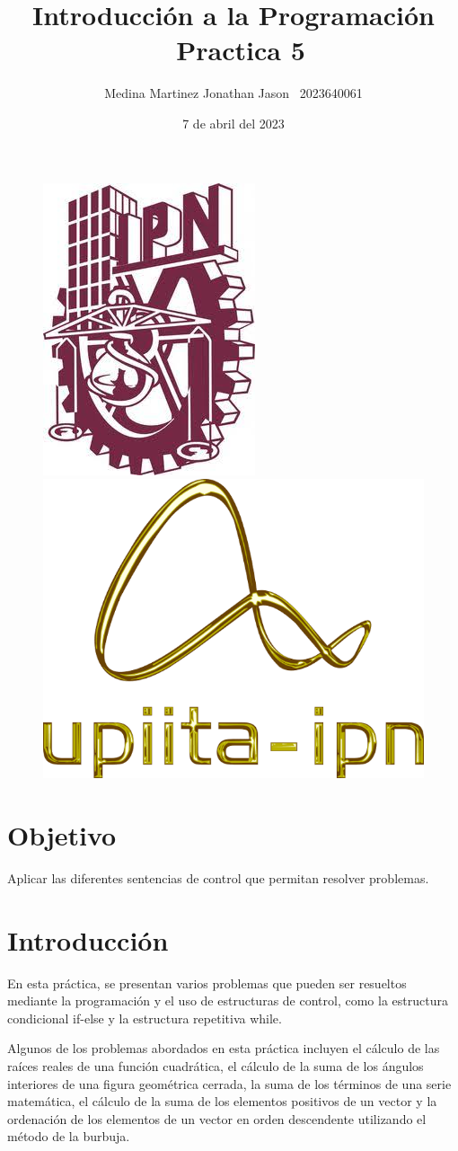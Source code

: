 \documentclass{article}
\title{Introducción a la Programación \ Practica 5}
\author{Medina Martinez Jonathan Jason \ 2023640061}
\date{7 de abril del 2023}
\begin{document}
	
	\fontsize{12}{16}\selectfont
	
	\begin{figure}[t]
		
		\includegraphics[width=2.5 cm]{Logo1.jpeg}
		\hfill
		\includegraphics[width=3 cm]{Logo2.png}
		
	\end{figure}
	
	\maketitle
	\newpage
	
	\tableofcontents
	\newpage
	
	\section{Objetivo}
	
	Aplicar las diferentes sentencias de control que permitan resolver problemas.
	
	\section{Introducción}
	
	En esta práctica, se presentan varios problemas que pueden ser resueltos mediante la programación y el uso de estructuras de control, como la estructura condicional if-else y la estructura repetitiva while.
	
	Algunos de los problemas abordados en esta práctica incluyen el cálculo de las raíces reales de una función cuadrática, el cálculo de la suma de los ángulos interiores de una figura geométrica cerrada, la suma de los términos de una serie matemática, el cálculo de la suma de los elementos positivos de un vector y la ordenación de los elementos de un vector en orden descendente utilizando el método de la burbuja.
	
\end{document}

